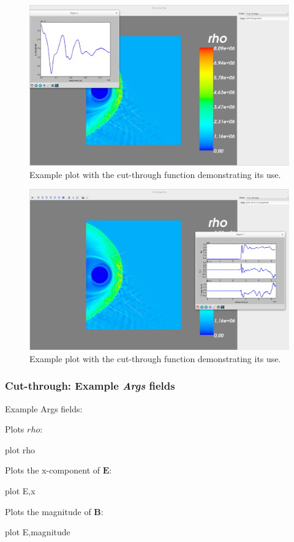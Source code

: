 \documentclass[a4paper,10pt]{article}
\begin{document}
\begin{figure}[H]
 \centering
 \includegraphics[width=\textwidth]{images/cut_through3.png}
 \caption{Example plot with the cut-through function demonstrating its use.}
 \label{fig:cut_through3}
\end{figure}

\begin{figure}[H]
 \centering
 \includegraphics[width=\textwidth]{images/cut_through4.png}
 \caption{Example plot with the cut-through function demonstrating its use.}
 \label{fig:cut_through4}
\end{figure}

\newpage

\subsubsection{Cut-through: Example \emph{Args} fields}

Example Args fields:

Plots $rho$:
\begin{python}
plot rho
\end{python}
Plots the x-component of $\mathbf{E}$:
\begin{python}
plot E,x
\end{python}
Plots the magnitude of $\mathbf{B}$:
\begin{python}
plot E,magnitude
\end{python}
\end{document}
